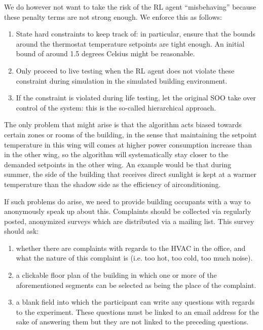 \documentclass{article}
\theoremstyle{definition}
\theoremstyle{remark}
\begin{document}
We do however not want to take the risk of the RL agent ``misbehaving'' because these penalty terms are not strong enough. We enforce this as follows:
\begin{enumerate}
    \item State hard constraints to keep track of: in particular, ensure that the bounds around the thermostat temperature setpoints are tight enough. An initial bound of around 1.5 degrees Celsius might be reasonable.
    \item Only proceed to live testing when the RL agent does not violate these constraint during simulation in the simulated building environment.
    \item If the constraint is violated during life testing, let the original SOO take over control of the system: this is the so-called hierarchical approach.
\end{enumerate}

The only problem that might arise is that the algorithm acts biased towards certain zones or rooms of the building, in the sense that maintaining the setpoint temperature in this wing will comes at higher power consumption increase than in the other wing, so the algorithm will systematically stay closer to the demanded setpoints in the other wing. An example would be that during summer, the side of the building that receives direct sunlight is kept at a warmer temperature than the shadow side as the efficiency of airconditioning.

If such problems do arise, we need to provide building occupants with a way to anonymously speak up about this. Complaints should be collected via regularly posted, anonymized surveys which are distributed via a mailing list. This survey should ask: 
\begin{enumerate}
    \item whether there are complaints with regards to the HVAC in the office, and what the nature of this complaint is (i.e. too hot, too cold, too much noise).
    \item a clickable floor plan of the building in which one or more of the aforementioned segments can be selected as being the place of the complaint.
    \item a blank field into which the participant can write any questions with regards to the experiment. These questions must be linked to an email address for the sake of answering them but they are not linked to the preceding questions.
\end{enumerate}
\end{document}
